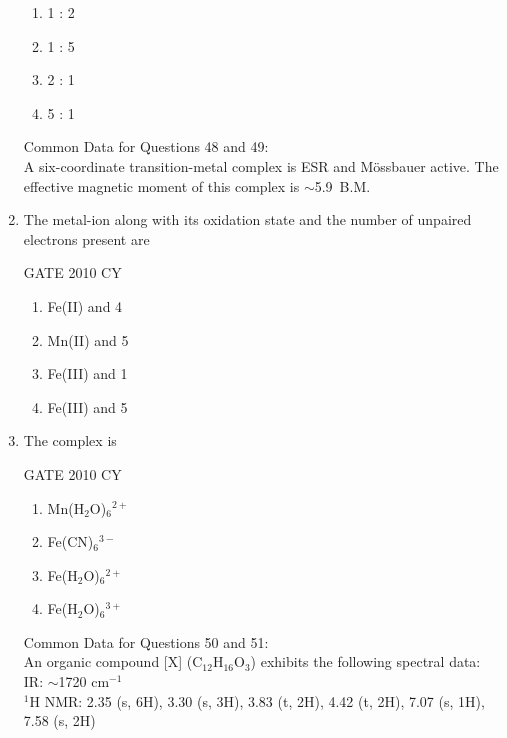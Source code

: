 \documentclass[journal,12pt,onecolumn]{IEEEtran}
\theoremstyle{remark}
\begin{document}
\begin{enumerate}
\begin{multicols}{2}
\begin{enumerate}
    \item 1 : 2
    \item 1 : 5
    \item 2 : 1
    \item 5 : 1
\end{enumerate}
\end{multicols}


Common Data for Questions 48 and 49:\\
A six-coordinate transition-metal complex is ESR and M\"ossbauer active. The effective magnetic moment of this complex is $\sim$5.9~B.M.

\item The metal-ion along with its oxidation state and the number of unpaired electrons present are

\hfill{GATE 2010 CY}

\begin{multicols}{2}
\begin{enumerate}
    \item Fe(II) and 4
    \item Mn(II) and 5
    \item Fe(III) and 1
    \item Fe(III) and 5
\end{enumerate}
\end{multicols}

\item The complex is

\hfill{GATE 2010 CY}

\begin{multicols}{2}
\begin{enumerate}
    \item Mn(H$_2$O)$_6$$^{2+}$
    \item Fe(CN)$_6$$^{3-}$
    \item Fe(H$_2$O)$_6$$^{2+}$
    \item Fe(H$_2$O)$_6$$^{3+}$
\end{enumerate}
\end{multicols}
Common Data for Questions 50 and 51:\\
An organic compound [X] (C$_{12}$H$_{16}$O$_3$) exhibits the following spectral data:\\
IR: $\sim$1720 cm$^{-1}$\\
$^1$H NMR: 2.35 (s, 6H), 3.30 (s, 3H), 3.83 (t, 2H), 4.42 (t, 2H), 7.07 (s, 1H), 7.58 (s, 2H)


\end{enumerate}
\end{document}
